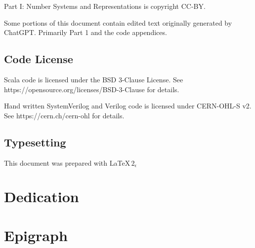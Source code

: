 \documentclass[11pt]{book}
\begin{document}
\vspace{\baselineskip}\par
{}
Part I: Number Systems and Representations is copyright CC-BY.

\vspace{\baselineskip}\par
\noindent Some portions of this document contain edited text originally generated by ChatGPT. Primarily Part 1 and the code appendices.

\section*{Code License}
Scala code is licensed under the BSD 3-Clause License. See https://opensource.org/licenses/BSD-3-Clause for details.

\vspace{\baselineskip}\par
{}
\noindent Hand written SystemVerilog and Verilog code is licensed under CERN-OHL-S v2. See https://cern.ch/cern-ohl for details.

\section*{Typesetting}
This document was prepared with \LaTeX $\, 2_{\epsilon}$

\sloppy

\chapter*{Dedication}

\chapter*{Epigraph}

\end{document}
